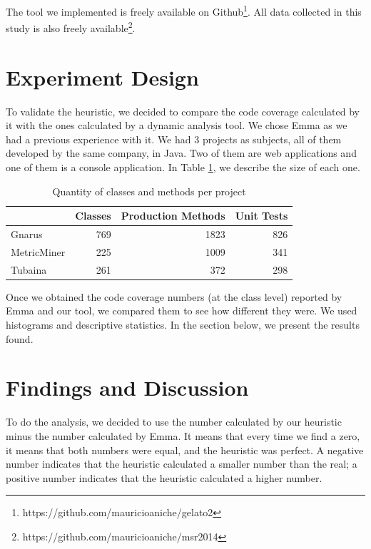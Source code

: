 \documentclass{sig-alternate}
\begin{document}
The tool we implemented is freely available on Github\footnote{https://github.com/mauricioaniche/gelato2}. 
All data collected in this study is also freely available\footnote{https://github.com/mauricioaniche/msr2014}.

\section{Experiment Design}
\label{sec-experiment}

To validate the heuristic, we decided to compare the code coverage calculated by it with the ones 
calculated by a dynamic analysis tool. We chose Emma as we had a previous experience with it. We
had 3 projects as subjects, all of them developed by the same company, in Java. Two of them are
web applications and one of them is a console application. In Table \ref{tab:projects}, we describe
the size of each one.

\begin{table}[h!]
\centering
\caption{Quantity of classes and methods per project}
\begin{tabular}{ | l | r | r | r | }
\hline
& Classes & Production Methods & Unit Tests\\ 
\hline
Gnarus & 769 & 1823 & 826\\ 
MetricMiner & 225 & 1009 & 341\\ 
Tubaina & 261 & 372 & 298\\ 

\hline
\end{tabular}
\label{tab:projects}
\end{table}

Once we obtained the code coverage numbers (at the class level) reported by Emma and our tool, we compared them to see how different
they were. We used histograms and descriptive statistics. In the section below, we present the results found.

\section{Findings and Discussion}
\label{sec-results}

To do the analysis, we decided to use the number calculated by our heuristic minus the
number calculated by Emma. It means that every time we find a zero, it means that both numbers
were equal, and the heuristic was perfect. A negative number indicates that the heuristic calculated
a smaller number than the real; a positive number indicates that the heuristic calculated a higher
number.
\end{document}
